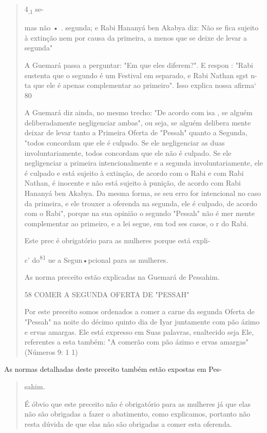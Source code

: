 \begin{quote}
4\textsubscript{,1} se-

mas não • . segunda; e Rabi Hananyá ben Akabya diz: Não se fica sujeito
à extinção nem por causa da primeira, a menos que se deixe de levar a
segunda"

A Guemará passa a perguntar: "Em que eles diferem?". E respon : "Rabi
sustenta que o segundo é um Festival em separado, e Rabi Nathan sgst
n-ta que ele é apenas complementar ao primeiro". Isso explica nossa
afirma` 80

A Guemará diz ainda, no mesmo trecho: "De acordo com isa , se alguém
deliberadamente negligenciar ambas", ou seja, se alguém delibera mente
deixar de levar tanto a Primeira Oferta de "Pessah" quanto a Segunda,
"todos concordam que ele é culpado. Se ele negligenciar as duas
involuntaria­mente, todos concordam que ele não é culpado. Se ele
negligenciar a primeira intencionalmente e a segunda involuntariamente,
ele é culpado e está sujeito à extinção, de acordo com o Rabi e com Rabi
Nathan, é inocente e não está sujeito à punição, de acordo com Rabi
Hananyá ben Akabya. Da mesma forma, se seu erro for intencional no caso
da primeira, e ele trouxer a oferenda na se­gunda, ele é culpado, de
acordo com o Rabi", porque na sua opinião o segun­do "Pessah" não é mer
mente complementar ao primeiro, e a lei segue, em tod ses casos, o r do
Rabi.

Este prec é obrigatório para as mulheres porque está expli-

c' do\textsuperscript{81} ue a Segun•pcional para as mulheres.

As norma preceito estão explicadas na Guemará de Pessahim.

58 COMER A SEGUNDA OFERTA DE "PESSAH"

Por este preceito somos ordenados a comer a carne da segunda Oferta de
"Pessah" na noite do décimo quinto dia de Iyar juntamente com pão ázimo
e ervas amargas. Ele está expresso em Suas palavras, enaltecido seja
Ele, refe­rentes a esta também: "A comerão com pão ázimo e ervas
amargas" (Números 9: 1 1)
\end{quote}

As normas detalhadas deste preceito também estão expostas em Pes-

\begin{quote}
sahim.

É óbvio que este preceito não é obrigatório para as mulheres já que elas
não são obrigadas a fazer o abatimento, como explicamos, portanto não
resta dúvida de que elas não são obrigadas a comer esta oferenda.
\end{quote}

